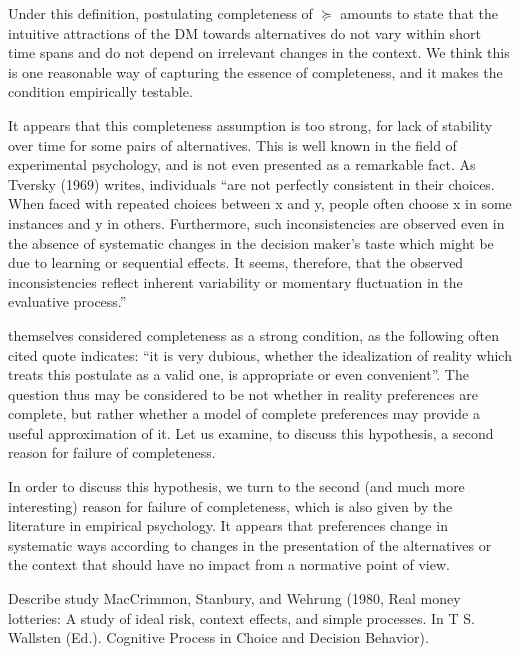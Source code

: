 \documentclass[french, english]{llncs}
\begin{document}
Under this definition, postulating completeness of $\succeq$ amounts to state that the intuitive attractions of the \ac{DM} towards alternatives do not vary within short time spans and do not depend on irrelevant changes in the context. We think this is one reasonable way of capturing the essence of completeness, and it makes the condition empirically testable.

It appears that this completeness assumption is too strong, for lack of stability over time for some pairs of alternatives. This is well known in the field of experimental psychology, and is not even presented as a remarkable fact. As Tversky (1969) writes, individuals “are not perfectly consistent in their choices. When faced with repeated choices between x and y, people often choose x in some instances and y in others. Furthermore, such inconsistencies are observed even in the absence of systematic changes in the decision maker’s taste which might be due to learning or sequential effects. It seems, therefore, that the observed inconsistencies reflect inherent variability or momentary fluctuation in the evaluative process.” 

\citet[p. 630]{vNM} themselves considered completeness as a strong condition, as the following often cited quote indicates: “it is very dubious, whether the idealization of reality which treats this postulate as a valid one, is appropriate or even convenient”.
The question thus may be considered to be not whether in reality preferences are complete, but rather whether a model of complete preferences may provide a useful approximation of it. Let us examine, to discuss this hypothesis, a second reason for failure of completeness.

In order to discuss this hypothesis, we turn to the second (and much more interesting) reason for failure of completeness, which is also given by the literature in empirical psychology. It appears that preferences change in systematic ways according to changes in the presentation of the alternatives or the context that should have no impact from a normative point of view.


Describe study MacCrimmon, Stanbury, and Wehrung (1980, Real money lotteries: A study of ideal risk, context effects, and simple processes. In T S. Wallsten (Ed.). Cognitive Process in Choice and Decision Behavior).
\end{document}
